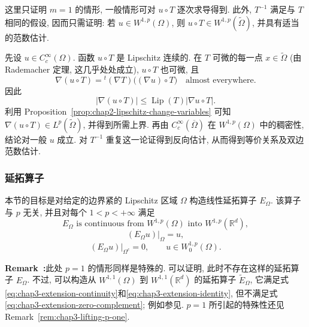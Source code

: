 \begin{Proof}
这里只证明 $m=1$ 的情形, 一般情形可对 $u\circ T$ 逐次求导得到. 此外, $T^{-1}$ 满足与 $T$ 相同的假设, 因而只需证明: 若 $u\in W^{1,p}(\Omega)$, 则 $u\circ T\in W^{1,p}(\widetilde\Omega)$, 并具有适当的范数估计.

先设 $u\in C_c^\infty(\Omega)$. 函数 $u\circ T$ 是 Lipschitz 连续的. 在 $T$ 可微的每一点 $x\in\widetilde\Omega$ (由 Rademacher 定理, 这几乎处处成立), $u\circ T$ 也可微, 且
\[
 \nabla(u\circ T)={}^t(\nabla T)\bigl((\nabla u)\circ T\bigr)
 \quad\text{almost everywhere}.
\]
因此
\[
 |\nabla(u\circ T)|\leq\operatorname{Lip}(T)|\nabla u\circ T|.
\]
利用 Proposition~\ref{prop:chap2-lipschitz-change-variables} 可知 $\nabla(u\circ T)\in L^p(\widetilde\Omega)$, 并得到所需上界. 再由 $C_c^\infty(\overline\Omega)$ 在 $W^{1,p}(\Omega)$ 中的稠密性, 结论对一般 $u$ 成立. 对 $T^{-1}$ 重复这一论证得到反向估计, 从而得到等价关系及双边范数估计.
\end{Proof}

\subsubsection{延拓算子}
\label{subsec:chap3-extension-operator}

本节的目标是对给定的边界紧的 Lipschitz 区域 $\Omega$ 构造线性延拓算子 $E_\Omega$. 该算子与 $p$ 无关, 并且对每个 $1<p<+\infty$ 满足
\begin{equation}
 E_\Omega\text{ is continuous from }W^{1,p}(\Omega)
 \text{ into }W^{1,p}(\mathbb R^d),
 \label{eq:chap3-extension-continuity}
\end{equation}
\begin{equation}
 (E_\Omega u)|_\Omega=u,
 \label{eq:chap3-extension-identity}
\end{equation}
\begin{equation}
 (E_\Omega u)|_{\Omega^c}=0,\qquad u\in W_0^{1,p}(\Omega).
 \label{eq:chap3-extension-zero-complement}
\end{equation}

\par\noindent{}\textbf{Remark~\thechapterthreesectiontworemark:}\label{rem:chap3-extension-p-one}\quad 此处 $p=1$ 的情形同样是特殊的. 可以证明, 此时不存在这样的延拓算子 $E_\Omega$. 不过, 可以构造从 $W^{1,1}(\Omega)$ 到 $W^{1,1}(\mathbb R^d)$ 的延拓算子 $\widetilde E_\Omega$, 它满足式\eqref{eq:chap3-extension-continuity}和\eqref{eq:chap3-extension-identity}, 但不满足式\eqref{eq:chap3-extension-zero-complement}; 例如参见. $p=1$ 所引起的特殊性还见 Remark~\ref{rem:chap3-lifting-p-one}.

